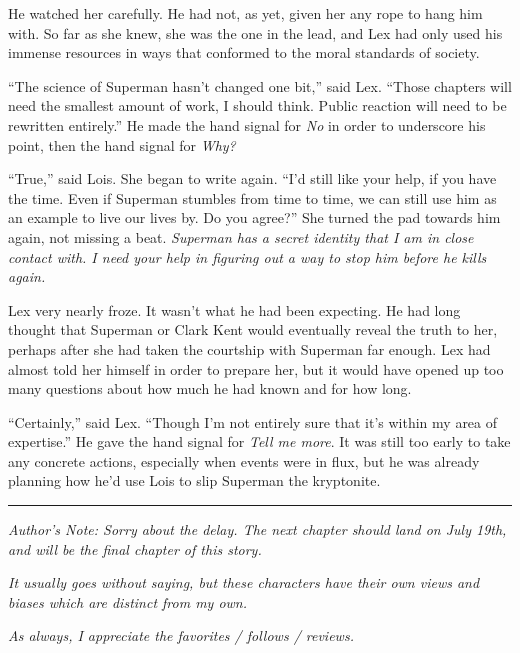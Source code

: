 He watched her carefully. He had not, as yet, given her any rope to hang
him with. So far as she knew, she was the one in the lead, and Lex had
only used his immense resources in ways that conformed to the moral
standards of society.

``The science of Superman hasn't changed one bit,'' said Lex. ``Those
chapters will need the smallest amount of work, I should think. Public
reaction will need to be rewritten entirely.'' He made the hand signal
for \emph{No} in order to underscore his point, then the hand signal for
\emph{Why?}

``True,'' said Lois. She began to write again. ``I'd still like your
help, if you have the time. Even if Superman stumbles from time to time,
we can still use him as an example to live our lives by. Do you agree?''
She turned the pad towards him again, not missing a beat. \emph{Superman
has a secret identity that I am in close contact with. I need your help
in figuring out a way to stop him before he kills again.}

Lex very nearly froze. It wasn't what he had been expecting. He had long
thought that Superman or Clark Kent would eventually reveal the truth to
her, perhaps after she had taken the courtship with Superman far enough.
Lex had almost told her himself in order to prepare her, but it would
have opened up too many questions about how much he had known and for
how long.

``Certainly,'' said Lex. ``Though I'm not entirely sure that it's within
my area of expertise.'' He gave the hand signal for \emph{Tell me more}.
It was still too early to take any concrete actions, especially when
events were in flux, but he was already planning how he'd use Lois to
slip Superman the kryptonite.

\begin{center}\rule{0.5\linewidth}{0.5pt}\end{center}

\emph{Author's Note: Sorry about the delay. The next chapter should land
on July 19th, and will be the final chapter of this story.}

\emph{It usually goes without saying, but these characters have their
own views and biases which are distinct from my own.}

\emph{As always, I appreciate the favorites / follows / reviews.}
